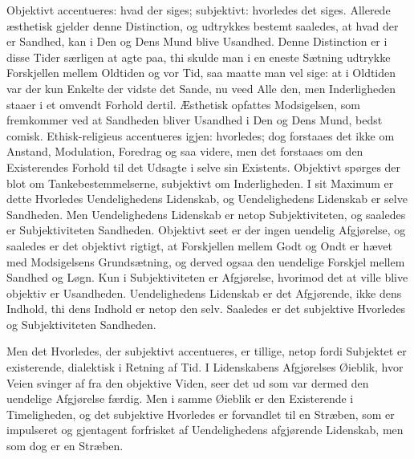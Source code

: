 \documentclass[12pt,a4paper]{article}
\begin{document}
Objektivt accentueres: hvad der siges; subjektivt: hvorledes det siges. Allerede æsthetisk gjelder denne Distinction, og udtrykkes bestemt saaledes, at hvad der er Sandhed, kan i Den og Dens Mund blive Usandhed. Denne Distinction er i disse Tider særligen at agte paa, thi skulde man i en eneste Sætning udtrykke Forskjellen mellem Oldtiden og vor Tid, saa maatte man vel sige: at i Oldtiden var der kun Enkelte der vidste det Sande, nu veed Alle den, men Inderligheden staaer i et omvendt Forhold dertil. Æsthetisk opfattes Modsigelsen, som fremkommer ved at Sandheden bliver Usandhed i Den og Dens Mund, bedst comisk. Ethisk-religieus accentueres igjen: hvorledes; dog forstaaes det ikke om Anstand, Modulation, Foredrag og saa videre, men det forstaaes om den Existerendes Forhold til det Udsagte i selve sin Existents. Objektivt spørges der blot om Tankebestemmelserne, subjektivt om Inderligheden. I sit Maximum er dette Hvorledes Uendelighedens Lidenskab, og Uendelighedens Lidenskab er selve Sandheden. Men Uendelighedens Lidenskab er netop Subjektiviteten, og saaledes er Subjektiviteten Sandheden. Objektivt seet er der ingen uendelig Afgjørelse, og saaledes er det objektivt rigtigt, at Forskjellen mellem Godt og Ondt er hævet med Modsigelsens Grundsætning, og derved ogsaa den uendelige Forskjel mellem Sandhed og Løgn. Kun i Subjektiviteten er Afgjørelse, hvorimod det at ville blive objektiv er Usandheden. Uendelighedens Lidenskab er det Afgjørende, ikke dens Indhold, thi dens Indhold er netop den selv. Saaledes er det subjektive Hvorledes og Subjektiviteten Sandheden.

Men det Hvorledes, der subjektivt accentueres, er tillige, netop fordi Subjektet er existerende, dialektisk i Retning af Tid. I Lidenskabens Afgjørelses Øieblik, hvor Veien svinger af fra den objektive Viden, seer det ud som var dermed den uendelige Afgjørelse færdig. Men i samme Øieblik er den Existerende i Timeligheden, og det subjektive Hvorledes er forvandlet til en Stræben, som er impulseret og gjentagent forfrisket af Uendelighedens afgjørende Lidenskab, men som dog er en Stræben.
\end{document}
